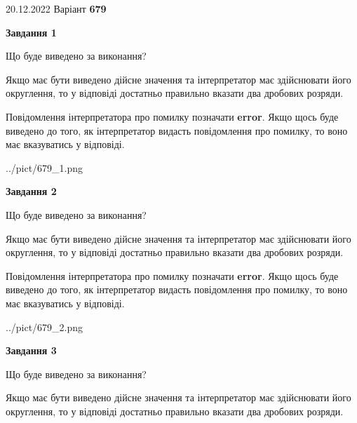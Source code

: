 \documentclass[12pt, ukrainian]{article}
\begin{document}
{20.12.2022 Варіант \No \textbf { 679 }\par}
{
\begin {Large}

{\begin {center}\textbf{Завдання 1}\end {center}}\par
Що буде виведено за виконання? \par

Якщо має бути виведено дійсне значення та інтерпретатор має здійснювати його округлення, 
то у відповіді достатньо правильно вказати два дробових розряди.

Повідомлення інтерпретатора про помилку позначати \textbf{error}.
Якщо щось буде виведено до того, як інтерпретатор видасть повідомлення про помилку, 
то воно має вказуватись у відповіді. \par

\begin{center}
	{../pict/679_1.png}
\end{center}
\newpage

{\begin {center}\textbf{Завдання 2}\end {center}}\par
Що буде виведено за виконання? \par

Якщо має бути виведено дійсне значення та інтерпретатор має здійснювати його округлення, 
то у відповіді достатньо правильно вказати два дробових розряди.

Повідомлення інтерпретатора про помилку позначати \textbf{error}.
Якщо щось буде виведено до того, як інтерпретатор видасть повідомлення про помилку, 
то воно має вказуватись у відповіді. \par

\begin{center}
	{../pict/679_2.png}
\end{center}
\newpage

{\begin {center}\textbf{Завдання 3}\end {center}}\par
Що буде виведено за виконання? \par

Якщо має бути виведено дійсне значення та інтерпретатор має здійснювати його округлення, 
то у відповіді достатньо правильно вказати два дробових розряди.


\end{Large}}
\end{document}
